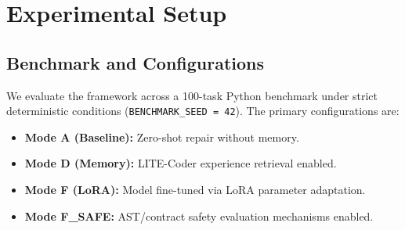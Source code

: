 \section{Experimental Setup}
\subsection{Benchmark and Configurations}
We evaluate the framework across a 100-task Python benchmark under strict deterministic conditions (\texttt{BENCHMARK\_SEED = 42}).
The primary configurations are:
\begin{itemize}
    \item \textbf{Mode A (Baseline):} Zero-shot repair without memory.
    \item \textbf{Mode D (Memory):} LITE-Coder experience retrieval enabled.
    \item \textbf{Mode F (LoRA):} Model fine-tuned via LoRA parameter adaptation.
    \item \textbf{Mode F\_SAFE:} AST/contract safety evaluation mechanisms enabled.
\end{itemize}
